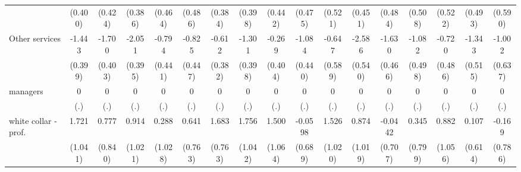{\begin{tabular}{l*{16}{c}}
                    &     (0.400)         &     (0.424)         &     (0.386)         &     (0.464)         &     (0.486)         &     (0.384)         &     (0.398)         &     (0.442)         &     (0.475)         &     (0.521)         &     (0.451)         &     (0.484)         &     (0.508)         &     (0.522)         &     (0.493)         &     (0.590)         \\
[1em]
Other services      &      -1.443\sym{***}&      -1.700\sym{***}&      -2.051\sym{***}&      -0.794         &      -0.825         &      -0.612         &      -1.301\sym{**} &      -0.269         &      -1.084\sym{*}  &      -0.647         &      -2.586\sym{***}&      -1.630\sym{***}&      -1.082\sym{*}  &      -0.720         &      -1.343\sym{**} &      -1.002         \\
                    &     (0.399)         &     (0.403)         &     (0.395)         &     (0.441)         &     (0.447)         &     (0.382)         &     (0.398)         &     (0.404)         &     (0.440)         &     (0.589)         &     (0.540)         &     (0.466)         &     (0.498)         &     (0.486)         &     (0.515)         &     (0.637)         \\
[1em]
managers            &           0         &           0         &           0         &           0         &           0         &           0         &           0         &           0         &           0         &           0         &           0         &           0         &           0         &           0         &           0         &           0         \\
                    &         (.)         &         (.)         &         (.)         &         (.)         &         (.)         &         (.)         &         (.)         &         (.)         &         (.)         &         (.)         &         (.)         &         (.)         &         (.)         &         (.)         &         (.)         &         (.)         \\
[1em]
white collar - prof.&       1.721         &       0.777         &       0.914         &       0.288         &       0.641         &       1.683\sym{*}  &       1.756         &       1.500         &     -0.0598         &       1.526         &       0.874         &     -0.0442         &       0.345         &       0.882         &       0.107         &      -0.169         \\
                    &     (1.041)         &     (0.840)         &     (1.021)         &     (1.028)         &     (0.763)         &     (0.763)         &     (1.042)         &     (1.064)         &     (0.689)         &     (1.020)         &     (1.019)         &     (0.707)         &     (0.799)         &     (1.056)         &     (0.614)         &     (0.786)         \\

\end{tabular}}
